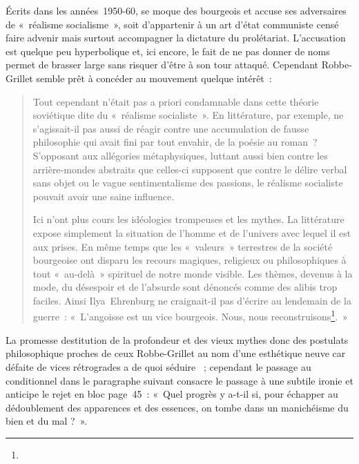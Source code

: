 \documentclass[12pt, a4paper]{article}
\begin{document}
Écrits dans les années~1950-60, \punr{} se moque des bourgeois et accuse ses adversaires de «~réalisme socialisme~», soit d'appartenir à un art d'état communiste censé faire advenir mais surtout accompagner la dictature du prolétariat. L'accusation est quelque peu hyperbolique et, ici encore, le fait de ne pas donner de noms permet de brasser large sans risquer d'être à son tour attaqué. Cependant Robbe-Grillet semble prêt à concéder au mouvement quelque intérêt~:
\begin{quote}
    Tout cependant n’était pas a priori condamnable dans cette théorie soviétique dite du «~réalisme socialiste~». En littérature, par exemple, ne s’agissait-il pas aussi de réagir contre une accumulation de fausse philosophie qui avait fini par tout envahir, de la poésie au roman~? S’opposant aux allégories métaphysiques, luttant aussi bien contre les arrière-mondes abstraits que celles-ci supposent que contre le délire verbal sans objet ou le vague sentimentalisme des passions, le réalisme socialiste pouvait avoir une saine influence.

    Ici n’ont plus cours les idéologies trompeuses et les mythes. La littérature expose simplement la situation de l’homme et de l’univers avec lequel il est aux prises. En même temps que les «~valeurs~» terrestres de la société bourgeoise ont disparu les recours magiques, religieux ou philosophiques à tout «~au-delà~» spirituel de notre monde visible. Les thèmes, devenus à la mode, du désespoir et de l’absurde sont dénoncés comme des alibis trop faciles. Ainsi Ilya~Ehrenburg ne craignait-il pas d’écrire au lendemain de la guerre~: «~L’angoisse est un vice bourgeois. Nous, nous reconstruisons\footnote{}.~»
\end{quote}
La promesse destitution de la profondeur et des vieux mythes donc des postulats philosophique proches de ceux Robbe-Grillet au nom d'une esthétique neuve car défaite de vices rétrogrades a de quoi séduire \robbe{}~; cependant le passage au conditionnel dans le paragraphe suivant consacre le passage à une subtile ironie et anticipe le rejet en bloc page~45~: «~Quel progrès y a-t-il si, pour échapper au dédoublement des apparences et des essences, on tombe dans un manichéisme du bien et du mal ?~».
\end{document}
